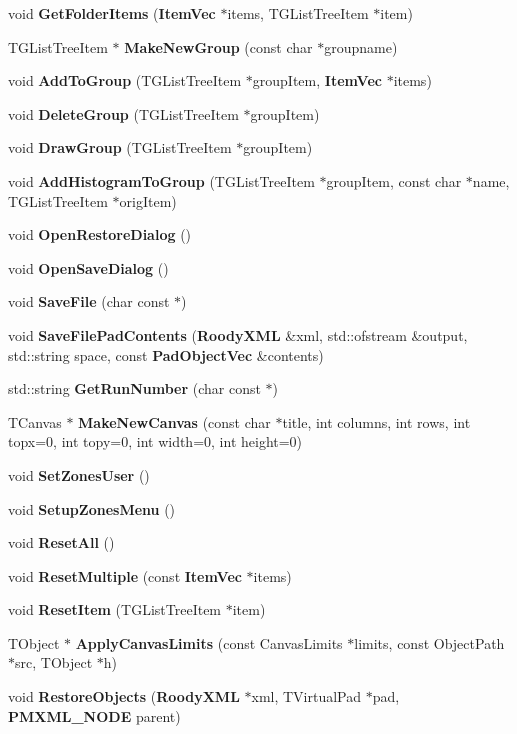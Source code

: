 \begin{DoxyCompactItemize}
\item 
void {\bf GetFolderItems} ({\bf ItemVec} $\ast$items, TGListTreeItem $\ast$item)
\item 
TGListTreeItem $\ast$ {\bf MakeNewGroup} (const char $\ast$groupname)
\item 
void {\bf AddToGroup} (TGListTreeItem $\ast$groupItem, {\bf ItemVec} $\ast$items)
\item 
void {\bf DeleteGroup} (TGListTreeItem $\ast$groupItem)
\item 
void {\bf DrawGroup} (TGListTreeItem $\ast$groupItem)
\item 
void {\bf AddHistogramToGroup} (TGListTreeItem $\ast$groupItem, const char $\ast$name, TGListTreeItem $\ast$origItem)
\item 
void {\bf OpenRestoreDialog} ()
\item 
void {\bf OpenSaveDialog} ()
\item 
void {\bf SaveFile} (char const $\ast$)
\item 
void {\bf SaveFilePadContents} ({\bf RoodyXML} \&xml, std::ofstream \&output, std::string space, const {\bf PadObjectVec} \&contents)
\item 
std::string {\bf GetRunNumber} (char const $\ast$)
\item 
TCanvas $\ast$ {\bf MakeNewCanvas} (const char $\ast$title, int columns, int rows, int topx=0, int topy=0, int width=0, int height=0)
\item 
void {\bf SetZonesUser} ()
\item 
void {\bf SetupZonesMenu} ()
\item 
void {\bf ResetAll} ()
\item 
void {\bf ResetMultiple} (const {\bf ItemVec} $\ast$items)
\item 
void {\bf ResetItem} (TGListTreeItem $\ast$item)
\item 
TObject $\ast$ {\bf ApplyCanvasLimits} (const CanvasLimits $\ast$limits, const ObjectPath $\ast$src, TObject $\ast$h)
\item 
void {\bf RestoreObjects} ({\bf RoodyXML} $\ast$xml, TVirtualPad $\ast$pad, {\bf PMXML\_\-NODE} parent)
\end{DoxyCompactItemize}
